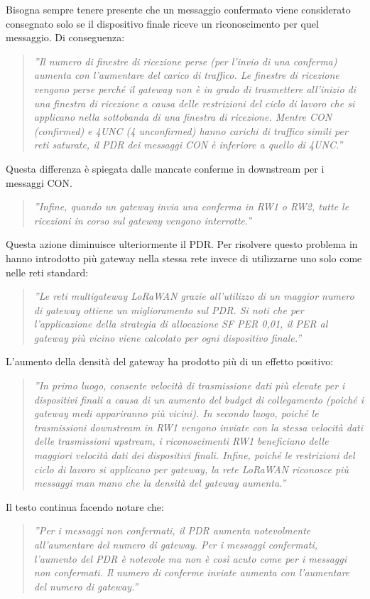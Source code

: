 \documentclass[a4paper]{report} %
\begin{document}
Bisogna sempre tenere presente che un messaggio confermato viene considerato consegnato solo se il dispositivo finale riceve un riconoscimento per quel messaggio. Di conseguenza:
\begin{quote}
	\textit{''Il numero di finestre di ricezione perse (per l'invio di una conferma) aumenta con l'aumentare del carico di traffico. Le finestre di ricezione vengono perse perché il gateway non è in grado di trasmettere all'inizio di una finestra di ricezione a causa delle restrizioni del ciclo di lavoro che si applicano nella sottobanda di una finestra di ricezione. Mentre CON (confirmed) e 4UNC (4 unconfirmed) hanno carichi di traffico simili per reti saturate, il PDR dei messaggi CON è inferiore a quello di 4UNC.''}
\end{quote}
Questa differenza è spiegata dalle mancate conferme in downstream per i messaggi CON. 
\begin{quote}
	\textit{''Infine, quando un gateway invia una conferma in RW1 o RW2, tutte le ricezioni in corso sul gateway vengono interrotte.''}
\end{quote}
Questa azione diminuisce ulteriormente il PDR. Per risolvere questo problema in \cite{art:rif.49} hanno introdotto più gateway nella stessa rete invece di utilizzarne uno solo come nelle reti standard:
\begin{quote}
	\textit{''Le reti multigateway LoRaWAN grazie all'utilizzo di un maggior numero di gateway ottiene un miglioramento sul PDR. Si noti che per l'applicazione della strategia di allocazione SF PER 0,01, il PER al gateway più vicino viene calcolato per ogni dispositivo finale.''}
\end{quote}	
L'aumento della densità del gateway ha prodotto più di un effetto positivo: 
\begin{quote}	
	\textit{''In primo luogo, consente velocità di trasmissione dati più elevate per i dispositivi finali a causa di un aumento del budget di collegamento (poiché i gateway medi appariranno più vicini). In secondo luogo, poiché le trasmissioni downstream in RW1 vengono inviate con la stessa velocità dati delle trasmissioni upstream, i riconoscimenti RW1 beneficiano delle maggiori velocità dati dei dispositivi finali. Infine, poiché le restrizioni del ciclo di lavoro si applicano per gateway, la rete LoRaWAN riconosce più messaggi man mano che la densità del gateway aumenta.''} 
\end{quote}
Il testo \cite{art:rif.49} continua facendo notare che:
\begin{quote}
	\textit{''Per i messaggi non confermati, il PDR aumenta notevolmente all'aumentare del numero di gateway. Per i messaggi confermati, l'aumento del PDR è notevole ma non è così acuto come per i messaggi non confermati. Il numero di conferme inviate aumenta con l'aumentare del numero di gateway.''}
\end{quote}
\end{document}
